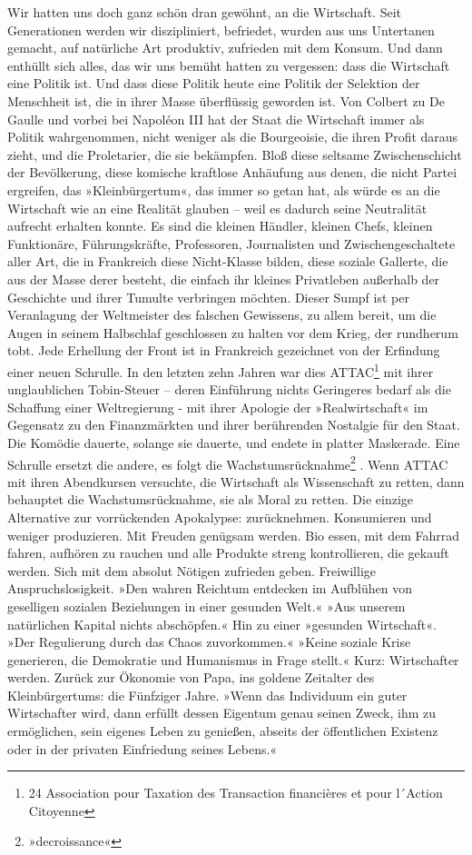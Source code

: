 Wir hatten uns doch ganz schön dran gewöhnt, an die Wirtschaft.
Seit Generationen werden wir diszipliniert, befriedet, wurden aus
uns Untertanen gemacht, auf natürliche Art produktiv, zufrieden mit
dem Konsum. Und dann enthüllt sich alles, das wir uns bemüht hatten
zu vergessen: dass die Wirtschaft eine Politik ist. Und dass diese
Politik heute eine Politik der Selektion der Menschheit ist, die in
ihrer Masse überflüssig geworden ist. Von Colbert zu De Gaulle und
vorbei bei Napoléon III hat der Staat die Wirtschaft immer als
Politik wahrgenommen, nicht weniger als die Bourgeoisie, die ihren
Profit daraus zieht, und die Proletarier, die sie bekämpfen. Bloß
diese seltsame Zwischenschicht der Bevölkerung, diese komische
kraftlose Anhäufung aus denen, die nicht Partei ergreifen, das
»Kleinbürgertum«, das immer so getan hat, als würde es an die
Wirtschaft wie an eine Realität glauben – weil es dadurch seine
Neutralität aufrecht erhalten konnte. Es sind die kleinen Händler,
kleinen Chefs, kleinen Funktionäre, Führungskräfte, Professoren,
Journalisten und Zwischengeschaltete
aller Art, die in Frankreich diese Nicht-Klasse bilden, diese
soziale Gallerte, die aus der Masse derer besteht, die einfach ihr
kleines Privatleben außerhalb der Geschichte und ihrer Tumulte
verbringen möchten. Dieser Sumpf ist per Veranlagung der
Weltmeister des falschen Gewissens, zu allem bereit, um die Augen
in seinem Halbschlaf geschlossen zu halten vor dem Krieg, der
rundherum tobt. Jede Erhellung der Front ist in Frankreich
gezeichnet von der Erfindung einer neuen Schrulle. In den letzten
zehn Jahren war dies ATTAC\footnote{
\foreignlanguage{french}{24 Association pour Taxation des Transaction 
financières et pour l´Action Citoyenne}
}
mit ihrer unglaublichen Tobin-Steuer –
deren Einführung nichts Geringeres bedarf als die Schaffung einer
Weltregierung - mit ihrer Apologie der »Realwirtschaft« im
Gegensatz zu den Finanzmärkten und ihrer berührenden Nostalgie für
den Staat. Die Komödie dauerte, solange sie dauerte, und endete in
platter Maskerade. Eine Schrulle ersetzt die andere, es folgt die
Wachstumsrücknahme\footnote{
»decroissance«
}%
. Wenn ATTAC mit ihren Abendkursen versuchte,
die Wirtschaft als Wissenschaft zu retten, dann behauptet die
Wachstumsrücknahme, sie als Moral zu retten. Die einzige
Alternative zur vorrückenden Apokalypse: zurücknehmen. Konsumieren
und weniger produzieren. Mit Freuden genügsam werden. Bio essen,
mit dem Fahrrad fahren, aufhören zu rauchen und alle Produkte
streng kontrollieren, die gekauft werden. Sich mit dem absolut
Nötigen zufrieden geben. Freiwillige Anspruchslosigkeit. »Den
wahren Reichtum entdecken im Aufblühen von geselligen sozialen
Beziehungen in einer gesunden Welt.« »Aus unserem natürlichen
Kapital nichts abschöpfen.« Hin zu einer »gesunden Wirtschaft«.
»Der Regulierung durch das Chaos zuvorkommen.« »Keine soziale Krise
generieren, die Demokratie und Humanismus in Frage stellt.« Kurz:
Wirtschafter werden. Zurück zur Ökonomie von Papa, ins goldene
Zeitalter des Kleinbürgertums: die Fünfziger Jahre. »Wenn das
Individuum ein guter Wirtschafter wird, dann erfüllt dessen
Eigentum genau seinen Zweck, ihm zu ermöglichen, sein eigenes Leben
zu genießen, abseits der öffentlichen Existenz oder in der privaten
Einfriedung seines Lebens.«

